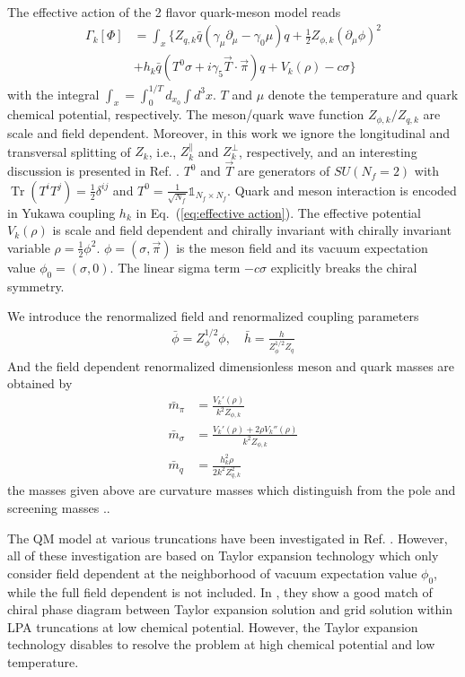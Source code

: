 \documentclass[%
reprint,
superscriptaddress,
showpacs,preprintnumbers,
 amsmath,amssymb,
 aps,
prd,
]{revtex4-1}
\newcommand{\Tr}{\ensuremath{\operatorname{Tr}}}
\def\Eq#1{Eq.~(\ref{#1})}
\begin{document}
The effective action of the 2 flavor quark-meson model reads \cite{Fu:2015naa}
\begin{align}
	\Gamma_k [\Phi]&=\int_x\{Z_{q,k} \bar q (\gamma_\mu \partial_\mu-\gamma_0 \mu)q +\frac{1}{2} Z_{\phi,k}(\partial_\mu \phi)^2  \nonumber\\[2ex]
	&+ h_k \bar q (T^0 \sigma +i \gamma_5\vec{T} \cdot \vec{\pi} )q +V_k(\rho) - c \sigma \} \label{eq:effective action}
\end{align}
with the integral $\int_x=\int_0^{1/T}d_{x_0}\int d^3 x$. $T$ and $\mu$ denote the temperature and quark chemical potential,  respectively. The meson/quark wave function $Z_{\phi,k}/Z_{q,k}$ are scale and field dependent. Moreover, in this work we ignore the  longitudinal  and transversal  splitting of $Z_k$, i.e., $Z_k^\parallel $ and $Z_k^\perp$,  respectively, and an interesting discussion is presented in Ref. \cite{Yin:2019ebz}. $T^0$ and $\vec{T}$ are generators of $SU (N_f=2)$ with $\Tr(T^iT^j)=\frac{1}{2} \delta^{ij}$ and $T^0=\frac{1}{\sqrt{N_f}} \mathbb{1}_{N_f \times N_f}$. Quark and meson interaction is encoded in Yukawa coupling $h_k$ in \Eq{eq:effective action}. The effective potential $V_k(\rho)$ is scale and field dependent and chirally invariant with chirally invariant variable $\rho=\frac{1}{2}\phi^2$. $\phi=(\sigma ,\vec{\pi})$ is the meson field and its vacuum expectation value $\phi_0=(\sigma,0)$. The linear sigma term $- c \sigma$ explicitly breaks the chiral symmetry.

We introduce the renormalized field and renormalized coupling parameters
\begin{align}
	\bar{\phi}=Z_{\phi} ^{1/2}\phi , \quad \bar{h}=\frac{h}{Z_\phi^{1/2} Z_q}
\end{align}
And the field dependent renormalized dimensionless meson and quark masses are obtained by
\begin{align}
	\bar m_\pi&=\frac{V_k'(\rho)}{k^2 Z_{\phi,k}} \\[2ex]
	\bar m_\sigma&= \frac{V_k'(\rho)+2 \rho V_k''(\rho)} {k^2 Z_{\phi,k}}\\[2ex]
	\bar m_q&=\frac{h_k^2 \rho}{2 k^2 Z_{q,k}^2}\label{eq:mass}
\end{align}
the masses given above are curvature masses which distinguish from the pole and screening masses \cite{Herbst:2013ufa,Alkofer:2018guy}..

The QM model at various truncations have been investigated in Ref. \cite{Pawlowski:2014zaa,Fu:2015naa,Fu:2015amv,Rennecke:2016tkm,Yin:2019ebz}. However, all of these investigation are based on Taylor expansion technology which only consider field dependent at the neighborhood of vacuum expectation value $\phi_0$, while the full field dependent is not included. In \cite{Pawlowski:2014zaa}, they show a good match of chiral phase diagram between Taylor expansion solution and  grid solution within LPA truncations at low chemical potential. However, the Taylor expansion technology disables to resolve the problem at high chemical potential and low temperature.
\end{document}
